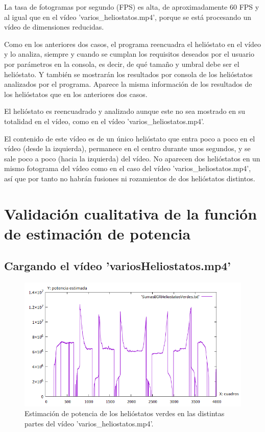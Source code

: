 La tasa de fotogramas por segundo (FPS) es alta, de aproximadamente 60 FPS y al igual que en el vídeo 'varios\_heliostatos.mp4', porque se está procesando un vídeo de dimensiones reducidas.

Como en los anteriores dos casos, el programa reencuadra el helióstato en el vídeo y lo analiza, siempre y cuando se cumplan los requisitos deseados por el usuario por parámetros en la consola, es decir, de qué tamaño y umbral debe ser el helióstato. Y también se mostrarán los resultados por consola de los helióstatos analizados por el programa. Aparece la misma información de los resultados de los helióstatos que en los anteriores dos casos.

El helióstato es reencuadrado y analizado aunque este no sea mostrado en su totalidad en el vídeo, como en el vídeo 'varios\_heliostatos.mp4'.

El contenido de este vídeo es de un único helióstato que entra poco a poco en el vídeo (desde la izquierda), permanece en el centro durante unos segundos, y se sale poco a poco (hacia la izquierda) del vídeo. No aparecen dos helióstatos en un mismo fotograma del vídeo como en el caso del vídeo 'varios\_heliostatos.mp4', así que por tanto no habrán fusiones ni rozamientos de dos helióstatos distintos.

\section{Validación cualitativa de la función de estimación de potencia}

\subsection{Cargando el vídeo 'variosHeliostatos.mp4'}

\begin{figure}[h!]
  	\centering
	\includegraphics[width=\textwidth]{ValidacionCualitativaFuncionEstimacionPotencia/SumasBGRHeliostatosVerdesVideo1.png}
	\caption{Estimación de potencia de los helióstatos verdes en las distintas partes del vídeo 'varios\_heliostatos.mp4'.
	\label{fig:ValidacionCualitativaFuncionEstimacionPotencia/SumasBGRHeliostatosVerdesVideo1.png}}
\end{figure}

